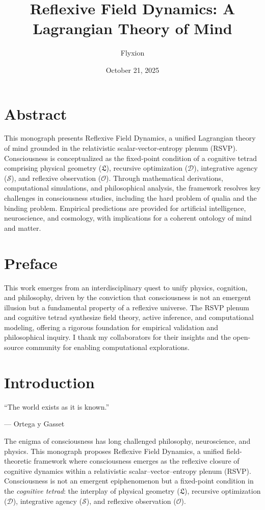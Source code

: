 \documentclass[12pt]{book}
\title{\textbf{Reflexive Field Dynamics: A Lagrangian Theory of Mind}}
\author{Flyxion}
\date{October 21, 2025}
\theoremstyle{definition}
\begin{document}
\maketitle
\tableofcontents

\chapter*{Abstract}

This monograph presents Reflexive Field Dynamics, a unified Lagrangian theory of mind grounded in the relativistic scalar-vector-entropy plenum (RSVP). Consciousness is conceptualized as the fixed-point condition of a cognitive tetrad comprising physical geometry (\(\mathfrak{L}\)), recursive optimization (\(\mathcal{D}\)), integrative agency (\(\mathcal{S}\)), and reflexive observation (\(\mathcal{O}\)). Through mathematical derivations, computational simulations, and philosophical analysis, the framework resolves key challenges in consciousness studies, including the hard problem of qualia and the binding problem. Empirical predictions are provided for artificial intelligence, neuroscience, and cosmology, with implications for a coherent ontology of mind and matter.

\chapter*{Preface}

This work emerges from an interdisciplinary quest to unify physics, cognition, and philosophy, driven by the conviction that consciousness is not an emergent illusion but a fundamental property of a reflexive universe. The RSVP plenum and cognitive tetrad synthesize field theory, active inference, and computational modeling, offering a rigorous foundation for empirical validation and philosophical inquiry. I thank my collaborators for their insights and the open-source community for enabling computational explorations.

\chapter{Introduction}
\epigraph{``The world exists as it is known.''}{--- Ortega y Gasset}

The enigma of consciousness has long challenged philosophy, neuroscience, and physics. This monograph proposes Reflexive Field Dynamics, a unified field-theoretic framework where consciousness emerges as the reflexive closure of cognitive dynamics within a relativistic scalar–vector–entropy plenum (RSVP). Consciousness is not an emergent epiphenomenon but a fixed-point condition in the \emph{cognitive tetrad}: the interplay of physical geometry (\(\mathfrak{L}\)), recursive optimization (\(\mathcal{D}\)), integrative agency (\(\mathcal{S}\)), and reflexive observation (\(\mathcal{O}\)).
\end{document}

